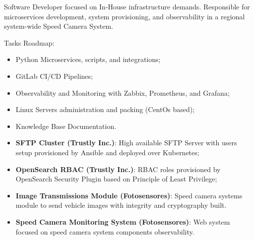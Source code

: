 \documentclass[10pt,a4paper]{altacv}
\begin{document}
Software Developer focused on In-House infrastructure demands. Responsible for microservices development, system provisioning, and observability in a regional system-wide Speed Camera System.

\bigskip

Tasks Roadmap:

\bigskip

\begin{itemize}
    \item Python Microservices, scripts, and integrations;
    \item GitLab CI/CD Pipelines;
    \item Observability and Monitoring with Zabbix, Prometheus, and Grafana;
    \item Linux Servers administration and packing (CentOs based);
    \item Knowledge Base Documentation.
\end{itemize}


\begin{itemize}
    \item \textbf{SFTP Cluster (Trustly Inc.)}: High available SFTP Server with users setup provisioned by Ansible and deployed over Kubernetes;
    \item \textbf{OpenSearch RBAC (Trustly Inc.)}: RBAC roles provisioned by OpenSearch Security Plugin based on Principle of Least Privilege;
    \item \textbf{Image Transmissions Module (Fotosensores)}: Speed camera systems module to send vehicle images with integrity and cryptography built.
    \item \textbf{Speed Camera Monitoring System (Fotosensores)}: Web system focused on speed camera system components observability.
\end{itemize}




\clearpage
\end{document}
